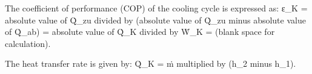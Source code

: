The coefficient of performance (COP) of the cooling cycle is expressed as:  
ε_K = absolute value of Q̇_zu divided by (absolute value of Q̇_zu minus absolute value of Q̇_ab) = absolute value of Q̇_K divided by Ẇ_K = (blank space for calculation).  

The heat transfer rate is given by:  
Q̇_K = ṁ multiplied by (h_2 minus h_1).